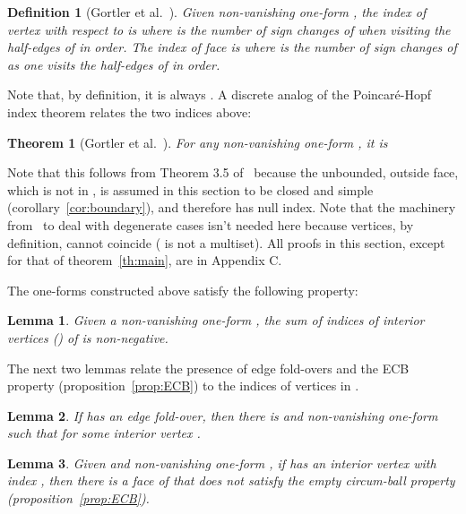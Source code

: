 \documentclass[11pt]{article}
\newtheorem{theorem}{Theorem}
\newtheorem{lemma}{Lemma}
\newtheorem{definition}{Definition}
\begin{document}
\begin{definition}[Gortler et al.\ \cite{1form}]
Given non-vanishing one-form ,
the index of vertex  with respect to  is 
	where  is the number of sign changes of  
	when visiting the half-edges of  in order. 
The index of face  is  where  is the number
of sign changes of  as one visits the half-edges of  in order. 
\end{definition}

Note that, by definition, it is always . 
A discrete analog of the Poincar\'e-Hopf index theorem relates 
the two indices above:

\begin{theorem}[Gortler et al.\ \cite{1form}]\label{lem:ph}
For any non-vanishing one-form , it is 

\end{theorem}

Note that this follows from Theorem 3.5 of~\cite{1form} because the unbounded, 
outside face, which is not in , is assumed in this section to be closed and simple
(corollary~\ref{cor:boundary}), and therefore has null index. Note that the machinery from~\cite{1form} to deal with degenerate cases
isn't needed here because vertices, by definition, cannot coincide ( is not a multiset). 
All  proofs in this section, except for that of theorem~\ref{th:main}, are  in Appendix C. 

The one-forms  constructed above satisfy the following property:

\begin{lemma}\label{lem:non-negative}
	Given a non-vanishing one-form , the sum of indices of interior vertices () of  is non-negative. 
\end{lemma}




The next two lemmas relate the presence of edge fold-overs and 
the ECB property (proposition~\ref{prop:ECB})  to the indices of vertices in . 


\begin{lemma}\label{lem:index-1}
If  has an edge fold-over, then there is  and non-vanishing one-form  such
that  for some interior vertex . \end{lemma}


\begin{lemma}\label{lem:index1}
Given  and non-vanishing one-form , if  has an interior vertex  with index
, then there is a face  of
 that does not satisfy the empty circum-ball property (proposition~\ref{prop:ECB}). 
\end{lemma}
\end{document}

